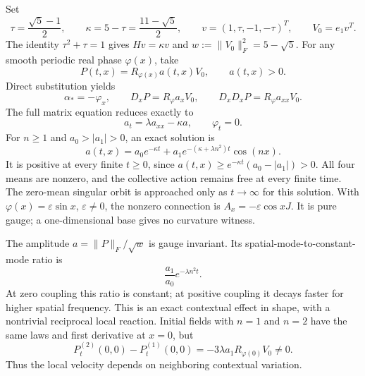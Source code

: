 \documentclass[11pt]{article}
\begin{document}
Set
\begin{equation}
 \tau=\frac{\sqrt5-1}{2},\qquad
 \kappa=5-\tau=\frac{11-\sqrt5}{2},\qquad
 v=(1,\tau,-1,-\tau)^T,\qquad V_0=e_1v^T.
\end{equation}
The identity $\tau^2+\tau=1$ gives $Hv=\kappa v$ and
$w:=\|V_0\|_F^2=5-\sqrt5$.
For any smooth periodic real phase $\varphi(x)$, take
\begin{equation}
 P(t,x)=R_{\varphi(x)}a(t,x)V_0,\qquad a(t,x)>0.
\end{equation}
Direct substitution yields
\begin{equation}
 \alpha_*=-\varphi_x,\qquad
 D_xP=R_\varphi a_xV_0,\qquad
 D_xD_xP=R_\varphi a_{xx}V_0.
\end{equation}
The full matrix equation reduces exactly to
\begin{equation}
 a_t=\lambda a_{xx}-\kappa a,\qquad \varphi_t=0.
\end{equation}
For $n\geq1$ and $a_0>|a_1|>0$, an exact solution is
\begin{equation}
 \boxed{a(t,x)=a_0e^{-\kappa t}
                 +a_1e^{-(\kappa+\lambda n^2)t}\cos(nx).}
 \label{eq:exact}
\end{equation}
It is positive at every finite $t\geq0$, since
$a(t,x)\geq e^{-\kappa t}(a_0-|a_1|)>0$.
All four means are nonzero, and the collective action remains free at every finite time. The zero-mean singular orbit is approached only as $t\to\infty$ for this solution. With $\varphi(x)=\varepsilon\sin x$, $\varepsilon\ne0$, the nonzero connection is $A_x=-\varepsilon\cos x J$. It is pure gauge; a one-dimensional base gives no curvature witness.

The amplitude $a=\|P\|_F/\sqrt w$ is gauge invariant. Its spatial-mode-to-constant-mode ratio is
\begin{equation}
 \frac{a_1}{a_0}e^{-\lambda n^2t}.
\end{equation}
At zero coupling this ratio is constant; at positive coupling it decays faster for higher spatial frequency. This is an exact contextual effect in shape, with a nontrivial reciprocal local reaction. Initial fields with $n=1$ and $n=2$ have the same laws and first derivative at $x=0$, but
\begin{equation}
 P_t^{(2)}(0,0)-P_t^{(1)}(0,0)
 =-3\lambda a_1R_{\varphi(0)}V_0\ne0.
\end{equation}
Thus the local velocity depends on neighboring contextual variation.
\end{document}
